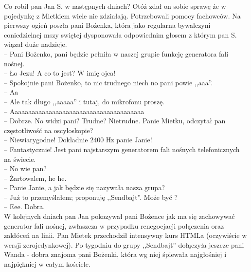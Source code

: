 \documentclass[a4paper,polish,titlepage,12pt]{article}
\begin{document}
Co robił pan Jan S. w następnych dniach? Otóż zdał on sobie sprawę że w pojedynkę z Mietkiem wiele nie zdziałają. Potrzebowali pomocy fachowców. Na pierwszy ogień poszła 
pani Bożenka, która jako regularna bywalczyni coniedzielnej mszy swiętej dysponowała odpowiednim głosem z którym pan S. wiązał duże nadzieje.\\
-- Pani Bożenko, pani będzie pełniła w naszej grupie funkcję generatora fali nośnej.\\
-- Ło Jezu! A co to jest? W imię ojca!\\
-- Spokojnie pani Bożenko, to nic trudnego niech no pani powie ,,aaa''.\\
-- Aa\\
-- Ale tak długo ,,aaaaa'' i tutaj, do mikrofonu proszę.\\
-- Aaaaaaaaaaaaaaaaaaaaaaaaaaaaaaaaaaaaaaa\\
-- Dobrze. No widzi pani? Trudne? Nietrudne. Panie Mietku, odczytał pan częstotliwość na oscyloskopie?\\
-- Niewiarygodne! Dokladnie 2400 Hz panie Janie!\\
-- Fantastycznie! Jest pani najstarszym generatorem fali nośnych telefonicznych na świecie.\\
-- No wie pan?\\
-- Żartowalem, he he.\\
-- Panie Janie, a jak będzie się nazywała nasza grupa?\\
-- Już to przemyślałem; proponuję ,,Sendbajt''. Może być ?\\
-- Eee. Dobra.\\

W kolejnych dniach pan Jan pokazywał pani Bożence jak ma się zachowywać generator fali nośnej, zwłaszcza w przypadku renegocjacji połączenia oraz 
zakłóceń na linii. Pan Mietek przechodził intensywny kurs HTMLa (oczywiście w wersji zerojedynkowej). Po tygodniu do grupy ,,Sendbajt'' dołączyła 
jeszcze pani Wanda - dobra znajoma pani Bożenki, która wg niej śpiewała najgłośniej i najpiękniej w całym kościele.
\end{document}
